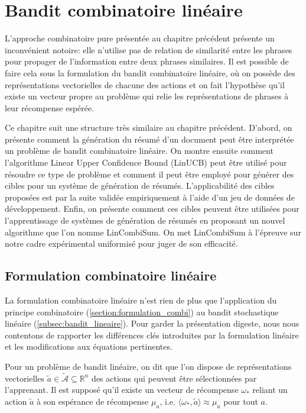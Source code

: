 \chapter{Bandit combinatoire linéaire}
\label{chap:bandit_combi_lin}                   %

L'approche combinatoire pure présentée au chapitre précédent présente un inconvénient
notoire: elle n'utilise pas de relation de similarité entre les phrases pour propager
de l'information entre deux phrases similaires.
Il est possible de faire cela sous la formulation du bandit combinatoire linéaire,
où on possède des représentations vectorielles de chacune des actions et on
fait l'hypothèse qu'il existe un vecteur propre au problème qui relie
les représentations de phrases à leur récompense espérée.

Ce chapitre suit une structure très similaire au chapitre précédent.
D'abord, on présente comment la génération du résumé d'un document
peut être interprétée un problème de bandit combinatoire \citep{CESABIANCHI20121404}
linéaire.
On montre ensuite comment l'algorithme Linear Upper Confidence Bound (LinUCB) 
\citep{chu2011contextual} peut être utilisé 
pour résoudre ce type de problème et comment il peut être employé pour 
générer des cibles pour un système de génération de résumés.
L'applicabilité des cibles proposées est par la suite validée empiriquement 
à l'aide d'un jeu de données de développement.
Enfin, on présente comment ces cibles peuvent être utilisées pour 
l'apprentissage de systèmes de génération de résumés en proposant 
un nouvel algorithme que l'on nomme LinCombiSum.
On met LinCombiSum à l'épreuve sur notre cadre expérimental 
uniformisé pour juger de son efficacité.

\section{Formulation combinatoire linéaire}

La formulation combinatoire linéaire n'est rien de plus que 
l'application du principe combinatoire (\ref{section:formulation_combi})
au bandit stochastique linéaire (\ref{subsec:bandit_lineaire}).
Pour garder la présentation digeste,
nous nous contentons de rapporter les différences clés 
introduites par la formulation linéaire et les modifications
aux équations pertinentes.

Pour un problème de bandit linéaire, on dit que l'on dispose 
de représentations vectorielles $\tilde{a} \in \tilde{\mathcal{A}} \subseteq \mathbb{R}^n$
des actions qui peuvent être sélectionnées par l'apprenant.
Il est supposé qu'il existe un vecteur de récompense $\omega_*$
reliant un action $\tilde{a}$ à son espérance de récompense $\mu_a$, i.e.
$\langle \omega_*, \tilde{a}\rangle \approx \mu_a$ pour tout $a$.

